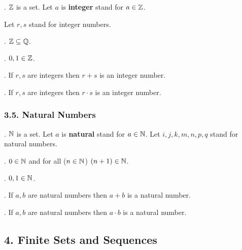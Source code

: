 
\begin{signature}.
${\Bbb Z}$ is a set. Let $a$ is {\bf integer} stand for $a \in {\Bbb Z}$.
\end{signature}

Let $r,s$ stand for integer numbers.

\begin{axiom}.
${\Bbb Z} \subseteq {\Bbb Q}$.
\end{axiom}

\begin{axiom}.
$0,1 \in {\Bbb Z}$.
\end{axiom}

\begin{axiom}.
If $r,s$ are integers then $r+s$ is an integer number.
\end{axiom}

\begin{axiom}.
If $r,s$ are integers then $r \cdot s$ is an integer number.
\end{axiom}



\subsubsection{3.5. Natural Numbers}

\begin{signature}.
${\Bbb N}$ is a set. Let $a$ is {\bf natural} stand for $a \in {\Bbb N}$.
Let $i,j,k,m,n,p,q$ stand for natural numbers. 
\end{signature}

\begin{axiom}.
$0 \in {\Bbb N}$ and for all ($n \in {\Bbb N}$) $(n+1) \in {\Bbb N}$.
\end{axiom}

\begin{axiom}.
$0,1 \in {\Bbb N}$.
\end{axiom}

\begin{axiom}.
If $a,b$ are natural numbers then $a+b$ is a natural number.
\end{axiom}

\begin{axiom}.
If $a,b$ are natural numbers then $a \cdot b$ is a natural number.
\end{axiom}

\subsection{4. Finite Sets and Sequences}

